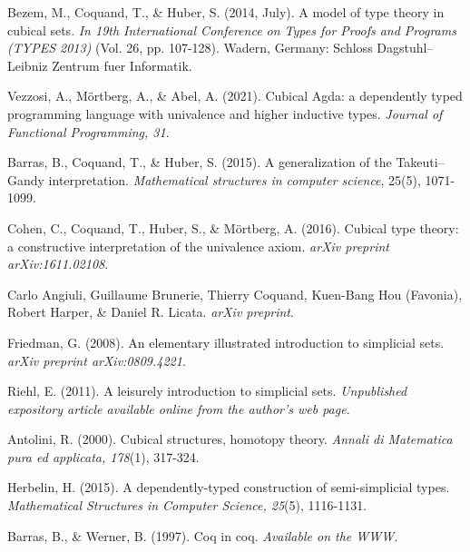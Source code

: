 \documentclass[10pt]{art.cls/art}
\begin{document}
\newpage
\begin{thebibliography}{10}
  Bezem, M., Coquand, T., \& Huber, S. (2014, July). A model of type theory in cubical sets. \emph{In 19th International Conference on Types for Proofs and Programs (TYPES 2013)} (Vol. 26, pp. 107-128). Wadern, Germany: Schloss Dagstuhl–Leibniz Zentrum fuer Informatik.

  Vezzosi, A., Mörtberg, A., \& Abel, A. (2021). Cubical Agda: a dependently typed programming language with univalence and higher inductive types. \emph{Journal of Functional Programming, 31}.

  Barras, B., Coquand, T., \& Huber, S. (2015). A generalization of the Takeuti–Gandy interpretation. \emph{Mathematical structures in computer science}, 25(5), 1071-1099.

  Cohen, C., Coquand, T., Huber, S., \& Mörtberg, A. (2016). Cubical type theory: a constructive interpretation of the univalence axiom. \emph{arXiv preprint arXiv:1611.02108}.

  Carlo Angiuli, Guillaume Brunerie, Thierry Coquand, Kuen-Bang Hou (Favonia), Robert Harper, \& Daniel R. Licata. \emph{arXiv preprint}.

  Friedman, G. (2008). An elementary illustrated introduction to simplicial sets. \emph{arXiv preprint arXiv:0809.4221}.

  Riehl, E. (2011). A leisurely introduction to simplicial sets. \emph{Unpublished expository article available online from the author's web page}.

  Antolini, R. (2000). Cubical structures, homotopy theory. \emph{Annali di Matematica pura ed applicata, 178}(1), 317-324.

  Herbelin, H. (2015). A dependently-typed construction of semi-simplicial types. \emph{Mathematical Structures in Computer Science, 25}(5), 1116-1131.

  Barras, B., \& Werner, B. (1997). Coq in coq. \emph{Available on the WWW.}
\end{thebibliography}
\end{document}
